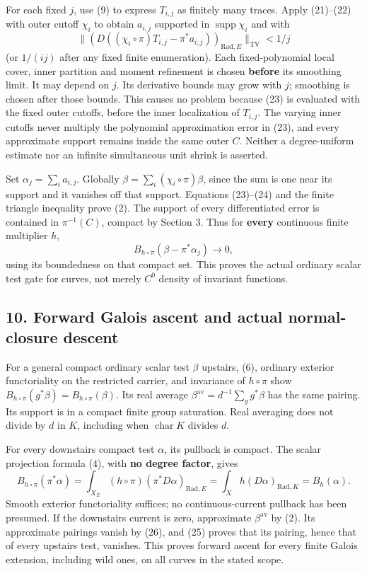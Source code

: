 \documentclass[
  11pt,
]{article}
\begin{document}
For each fixed \(j\), use (9) to express \(T_{i,j}\) as finitely many
traces. Apply (21)--(22) with outer cutoff \(\chi_i\) to obtain
\(a_{i,j}\) supported in \(\operatorname{supp}\chi_i\) and with \[
 \big\|(D((\chi_i\circ\pi)T_{i,j}-\pi^*a_{i,j}))_{
                     \mathrm{Rad},E}\big\|_{\mathrm{TV}}<1/j       \tag{24}
\] (or \(1/(ij)\) after any fixed finite enumeration). Each
fixed-polynomial local cover, inner partition and moment refinement is
chosen \textbf{before} its smoothing limit. It may depend on \(j\). Its
derivative bounds may grow with \(j\); smoothing is chosen after those
bounds. This causes no problem because (23) is evaluated with the fixed
outer cutoffs, before the inner localization of \(T_{i,j}\). The varying
inner cutoffs never multiply the polynomial approximation error in (23),
and every approximate support remains inside the same outer \(C\).
Neither a degree-uniform estimate nor an infinite simultaneous unit
shrink is asserted.

Set \(\alpha_j=\sum_i a_{i,j}\). Globally
\(\beta=\sum_i(\chi_i\circ\pi)\beta\), since the sum is one near its
support and it vanishes off that support. Equations (23)--(24) and the
finite triangle inequality prove (2). The support of every
differentiated error is contained in \(\pi^{-1}(C)\), compact by Section
3. Thus for \textbf{every} continuous finite multiplier \(h\), \[
       B_{h\circ\pi}(\beta-\pi^*\alpha_j)\longrightarrow0,
                                                               \tag{25}
\] using its boundedness on that compact set. This proves the actual
ordinary scalar test gate for curves, not merely \(C^0\) density of
invariant functions.

\subsection{10. Forward Galois ascent and actual normal-closure
descent}\label{forward-galois-ascent-and-actual-normal-closure-descent}

For a general compact ordinary scalar test \(\beta\) upstairs, (6),
ordinary exterior functoriality on the restricted carrier, and
invariance of \(h\circ\pi\) show
\(B_{h\circ\pi}(g^*\beta)=B_{h\circ\pi}(\beta)\). Its real average
\(\beta^{\mathrm{av}}=d^{-1}\sum_g g^*\beta\) has the same pairing. Its
support is in a compact finite group saturation. Real averaging does not
divide by \(d\) in \(K\), including when \(\operatorname{char}K\)
divides \(d\).

For every downstairs compact test \(\alpha\), its pullback is compact.
The scalar projection formula (4), with \textbf{no degree factor}, gives
\[
  B_{h\circ\pi}(\pi^*\alpha)
     =\int_{X_E}(h\circ\pi)(\pi^*D\alpha)_{\mathrm{Rad},E}
     =\int_X h(D\alpha)_{\mathrm{Rad},K}=B_h(\alpha).     \tag{26}
\] Smooth exterior functoriality suffices; no continuous-current
pullback has been presumed. If the downstairs current is zero,
approximate \(\beta^{\mathrm{av}}\) by (2). Its approximate pairings
vanish by (26), and (25) proves that its pairing, hence that of every
upstairs test, vanishes. This proves forward ascent for every finite
Galois extension, including wild ones, on all curves in the stated
scope.
\end{document}
